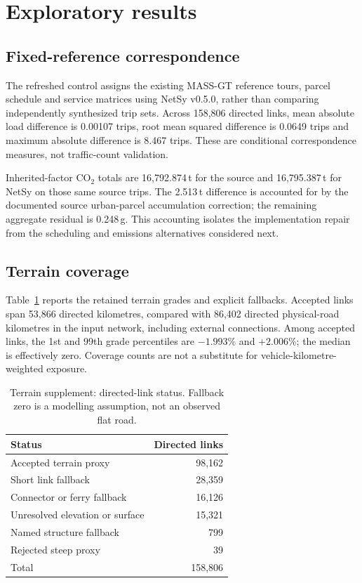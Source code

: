 \section{Exploratory results}
\subsection{Fixed-reference correspondence}
The refreshed control assigns the existing MASS-GT reference tours, parcel
schedule and service matrices using NetSy v0.5.0, rather than comparing
independently synthesized trip sets. Across 158,806 directed links, mean
absolute load difference is 0.00107 trips, root mean squared difference is
0.0649 trips and maximum absolute difference is 8.467 trips. These are
conditional correspondence measures, not traffic-count validation.

Inherited-factor CO$_2$ totals are 16,792.874\,t for the source and
16,795.387\,t for NetSy on those same source trips. The 2.513\,t difference
is accounted for by the documented source urban-parcel accumulation correction;
the remaining aggregate residual is 0.248\,g. This accounting isolates the implementation repair from the scheduling and
emissions alternatives considered next.

\subsection{Terrain coverage}
Table~\ref{tab:terrain} reports the retained terrain grades and explicit
fallbacks. Accepted links span 53,866 directed kilometres, compared with
86,402 directed physical-road kilometres in the input network, including
external connections. Among accepted links, the 1st and 99th grade percentiles
are $-1.993$\% and $+2.006$\%; the median is effectively zero. Coverage counts
are not a substitute for vehicle-kilometre-weighted exposure.

\begin{table}[htbp]
\centering
\caption{Terrain supplement: directed-link status. Fallback zero is a modelling
assumption, not an observed flat road.}
\label{tab:terrain}
\begin{tabular}{@{}lr@{}}
\toprule Status & Directed links \\
\midrule
Accepted terrain proxy & 98,162 \\
Short link fallback & 28,359 \\
Connector or ferry fallback & 16,126 \\
Unresolved elevation or surface & 15,321 \\
Named structure fallback & 799 \\
Rejected steep proxy & 39 \\
\midrule
Total & 158,806 \\
\bottomrule
\end{tabular}
\end{table}



